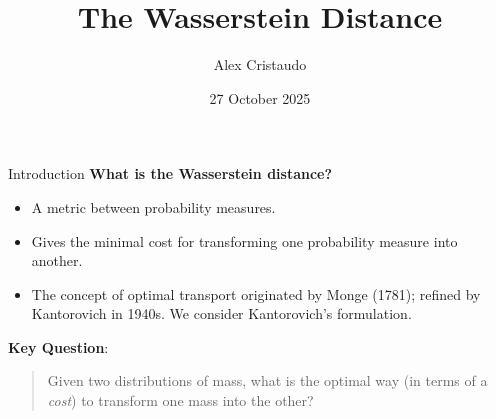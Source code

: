 \documentclass{beamer}
\title{The Wasserstein Distance}
\author{Alex Cristaudo}
\institute[UCT]{University of Cape Town}
\date{27 October 2025}
\begin{document}
\begin{frame}
  \titlepage
\end{frame}


\begin{frame}{Introduction}
  \textbf{What is the Wasserstein distance?}
  \begin{itemize}
    \item A metric between probability measures.
    \item Gives the minimal cost for transforming one probability measure into another.
    \item The concept of optimal transport originated by Monge (1781); refined by Kantorovich in 1940s. We consider Kantorovich's formulation.
  \end{itemize}

  \textbf{Key Question}:
  \begin{quote}
    Given two distributions of mass, what is the optimal way (in terms of a \emph{cost}) to transform one mass into the other?
  \end{quote}
\end{frame}
\end{document}
